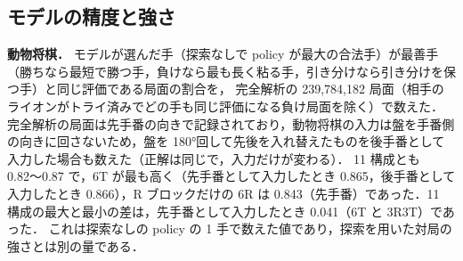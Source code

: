 \documentclass[submit]{ipsj}
\begin{document}
\subsection{モデルの精度と強さ}
\label{sec:reliability}
\textbf{動物将棋．}
モデルが選んだ手（探索なしで policy が最大の合法手）が最善手（勝ちなら最短で勝つ手，負けなら最も長く粘る手，引き分けなら引き分けを保つ手）と同じ評価である局面の割合を，
完全解析の 239,784,182 局面（相手のライオンがトライ済みでどの手も同じ評価になる負け局面を除く）で数えた．
完全解析の局面は先手番の向きで記録されており，動物将棋の入力は盤を手番側の向きに回さないため，盤を 180°回して先後を入れ替えたものを後手番として入力した場合も数えた（正解は同じで，入力だけが変わる）．
11 構成とも 0.82〜0.87 で，6T が最も高く（先手番として入力したとき 0.865，後手番として入力したとき 0.866），R ブロックだけの 6R は 0.843（先手番）であった．11 構成の最大と最小の差は，先手番として入力したとき 0.041（6T と 3R3T）であった．
これは探索なしの policy の 1 手で数えた値であり，探索を用いた対局の強さとは別の量である．
\end{document}
